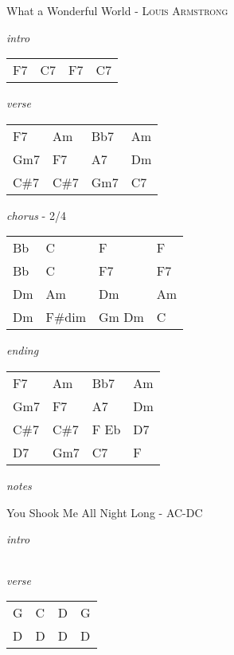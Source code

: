 \documentclass[12pt]{article}
\begin{document}
{\Huge What a Wonderful World} {\huge - \textsc{Louis Armstrong}}

\huge
\textit{intro}

\begin{tabular}{|P{1.25in}|P{1.25in}|P{1.25in}|P{1.25in}|}
  F7 & C7  & F7  &  C7 \\
\end{tabular}

\textit{verse}

\begin{tabular}{|P{1.25in}|P{1.25in}|P{1.25in}|P{1.25in}|}
  F7   &  Am  & Bb7  &  Am \\
  Gm7  &  F7  & A7   &  Dm \\
  C\#7 &  C\#7 & Gm7 & C7  \\
\end{tabular}

\textit{chorus} - 2/4

\begin{tabular}{|P{1.25in}|P{1.25in}|P{1.25in}|P{1.25in}|}
  Bb &  C & F  &  F \\
  Bb &  C & F7 &  F7 \\
  Dm & Am & Dm & Am \\
  Dm & F\#dim & Gm Dm & C \\
\end{tabular}

\textit{ending}

\begin{tabular}{|P{1.25in}|P{1.25in}|P{1.25in}|P{1.25in}|}
  F7   &  Am  & Bb7  &  Am \\
  Gm7  &  F7  & A7   &  Dm \\
  C\#7 &  C\#7 & F Eb & D7  \\
  D7   & Gm7  & C7   &  F \\
\end{tabular}

\textit{notes}

\newpage

{\Huge You Shook Me All Night Long} {\huge - \textsc{AC-DC}}

\huge
\textit{intro}

\begin{tabular}{|P{1.25in}|P{1.25in}|P{1.25in}|P{1.25in}|}

\end{tabular}

\textit{verse}

\begin{tabular}{|P{1.25in}|P{1.25in}|P{1.25in}|P{1.25in}|}
  G & C  & D &  G \\
  D & D & D & D \\
\end{tabular}
\end{document}
